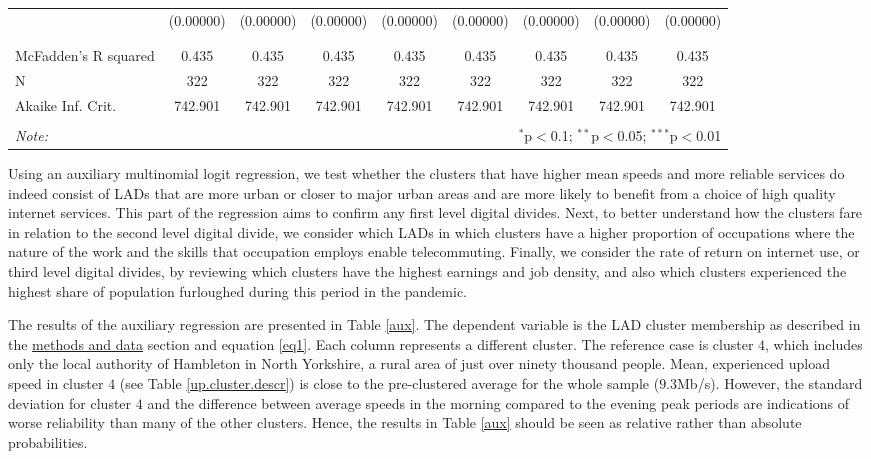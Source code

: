 \documentclass[]{interact}
\theoremstyle{plain}%
\theoremstyle{definition}
\theoremstyle{remark}
\begin{document}
\begin{table}
\begin{tabular}{@{\extracolsep{5pt}}lcccccccc}
  & (0.00000) & (0.00000) & (0.00000) & (0.00000) & (0.00000) & (0.00000) & (0.00000) & (0.00000) \\ 
  & & & & & & & & \\ 
\hline \\[-1.8ex] 
McFadden's R squared & 0.435 & 0.435 & 0.435 & 0.435 & 0.435 & 0.435 & 0.435 & 0.435 \\ 
N & 322 & 322 & 322 & 322 & 322 & 322 & 322 & 322 \\ 
Akaike Inf. Crit. & 742.901 & 742.901 & 742.901 & 742.901 & 742.901 & 742.901 & 742.901 & 742.901 \\ 
\hline 
\hline \\[-1.8ex] 
\textit{Note:}  & \multicolumn{8}{r}{$^{*}$p$<$0.1; $^{**}$p$<$0.05; $^{***}$p$<$0.01} \\ 
\end{tabular} 
\end{table}

Using an auxiliary multinomial logit regression, we test whether the
clusters that have higher mean speeds and more reliable services do
indeed consist of LADs that are more urban or closer to major urban
areas and are more likely to benefit from a choice of high quality
internet services. This part of the regression aims to confirm any first
level digital divides. Next, to better understand how the clusters fare
in relation to the second level digital divide, we consider which LADs
in which clusters have a higher proportion of occupations where the
nature of the work and the skills that occupation employs enable
telecommuting. Finally, we consider the rate of return on internet use,
or third level digital divides, by reviewing which clusters have the
highest earnings and job density, and also which clusters experienced
the highest share of population furloughed during this period in the
pandemic.

The results of the auxiliary regression are presented in Table
\ref{aux}. The dependent variable is the LAD cluster membership as
described in the \protect\hyperlink{sec:3}{methods and data} section and
equation \ref{eq1}. Each column represents a different cluster. The
reference case is cluster \(4\), which includes only the local authority
of Hambleton in North Yorkshire, a rural area of just over ninety
thousand people. Mean, experienced upload speed in cluster \(4\) (see
Table \ref{up.cluster.descr}) is close to the pre-clustered average for
the whole sample (\(9.3\)Mb/s). However, the standard deviation for
cluster \(4\) and the difference between average speeds in the morning
compared to the evening peak periods are indications of worse
reliability than many of the other clusters. Hence, the results in Table
\ref{aux} should be seen as relative rather than absolute probabilities.
\end{document}
